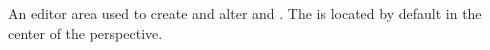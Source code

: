 \item[\gdtestcaseeditor]{
An editor area used to create and alter \gdcases and \gdsteps{}. The \gdtestcaseeditor is located by default in the center of the perspective.
}
